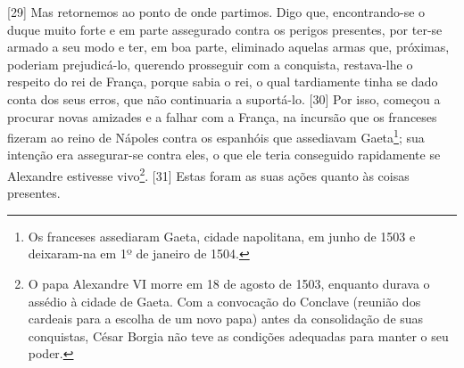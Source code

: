 {[}29{]} Mas retornemos ao ponto de onde partimos. Digo que,
encontrando-se o duque muito forte e em parte assegurado contra os
perigos presentes, por ter-se armado a seu modo e ter, em boa parte,
eliminado aquelas armas que, próximas, poderiam prejudicá-lo, querendo
prosseguir com a conquista, restava-lhe o respeito do rei de França,
porque sabia o rei, o qual tardiamente tinha se dado conta dos seus
erros, que não continuaria a suportá-lo. {[}30{]} Por isso, começou a
procurar novas amizades e a falhar com a França, na incursão que os
franceses fizeram ao reino de Nápoles contra os espanhóis que assediavam
Gaeta\footnote{Os franceses assediaram Gaeta, cidade napolitana, em
  junho de 1503 e deixaram-na em 1º de janeiro de 1504.}; sua intenção
era assegurar-se contra eles, o que ele teria conseguido rapidamente se
Alexandre estivesse vivo\footnote{O papa Alexandre VI morre em 18 de
  agosto de 1503, enquanto durava o assédio à cidade de Gaeta. Com a
  convocação do Conclave (reunião dos cardeais para a escolha de um novo
  papa) antes da consolidação de suas conquistas, César Borgia não teve
  as condições adequadas para manter o seu poder.}. {[}31{]} Estas foram
as suas ações quanto às coisas presentes.


